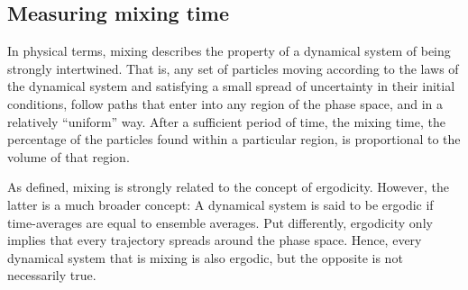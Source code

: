 \documentclass[11pt]{article}
\numberwithin{equation}{section}
\begin{document}
\subsection{Measuring mixing time}

In physical terms, mixing describes the property of a dynamical system of being strongly intertwined. That is, any set of particles moving according to the laws of the dynamical system and satisfying a small spread of uncertainty in their initial conditions, follow paths that enter into any region of the phase space, and in a relatively ``uniform'' way. After a sufficient period of time, the mixing time, the percentage of the particles found within a particular region, is proportional to the volume of that region. 

As defined, mixing is strongly related to the concept of ergodicity. However, the latter is a much broader concept: A dynamical system is said to be ergodic if time-averages are equal to ensemble averages. Put differently, ergodicity only implies that every trajectory spreads around the phase space. Hence, every dynamical system that is mixing is also ergodic, but the opposite is not necessarily true.
\end{document}
